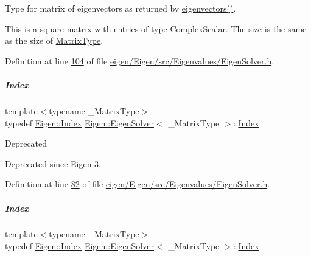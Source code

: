 Type for matrix of eigenvectors as returned by \hyperlink{group___eigenvalues___module_a66288022802172e3ee059283b26201d7}{eigenvectors()}. 

This is a square matrix with entries of type \hyperlink{group___eigenvalues___module_a4d0b2a773357d0a6ec98e026f04002ed}{Complex\+Scalar}. The size is the same as the size of \hyperlink{group___eigenvalues___module_a83acd180404ddaac8a678fa65a6b632b}{Matrix\+Type}. 

Definition at line \hyperlink{eigen_2_eigen_2src_2_eigenvalues_2_eigen_solver_8h_source_l00104}{104} of file \hyperlink{eigen_2_eigen_2src_2_eigenvalues_2_eigen_solver_8h_source}{eigen/\+Eigen/src/\+Eigenvalues/\+Eigen\+Solver.\+h}.

\mbox{\label{group___eigenvalues___module_a5bff6a6bc0efac67d52c60c2c3deb9ee}} 
\subparagraph{\texorpdfstring{Index}{Index}\hspace{0.1cm}{\footnotesize\ttfamily [1/2]}}
{\footnotesize\ttfamily template$<$typename \+\_\+\+Matrix\+Type$>$ \\
typedef \hyperlink{namespace_eigen_a62e77e0933482dafde8fe197d9a2cfde}{Eigen\+::\+Index} \hyperlink{group___eigenvalues___module_class_eigen_1_1_eigen_solver}{Eigen\+::\+Eigen\+Solver}$<$ \+\_\+\+Matrix\+Type $>$\+::\hyperlink{group___eigenvalues___module_a5bff6a6bc0efac67d52c60c2c3deb9ee}{Index}}

\begin{DoxyRefDesc}{Deprecated}
\item[\hyperlink{deprecated__deprecated000018}{Deprecated}]since \hyperlink{namespace_eigen}{Eigen} 3. \end{DoxyRefDesc}


Definition at line \hyperlink{eigen_2_eigen_2src_2_eigenvalues_2_eigen_solver_8h_source_l00082}{82} of file \hyperlink{eigen_2_eigen_2src_2_eigenvalues_2_eigen_solver_8h_source}{eigen/\+Eigen/src/\+Eigenvalues/\+Eigen\+Solver.\+h}.

\mbox{\label{group___eigenvalues___module_a5bff6a6bc0efac67d52c60c2c3deb9ee}} 
\subparagraph{\texorpdfstring{Index}{Index}\hspace{0.1cm}{\footnotesize\ttfamily [2/2]}}
{\footnotesize\ttfamily template$<$typename \+\_\+\+Matrix\+Type$>$ \\
typedef \hyperlink{namespace_eigen_a62e77e0933482dafde8fe197d9a2cfde}{Eigen\+::\+Index} \hyperlink{group___eigenvalues___module_class_eigen_1_1_eigen_solver}{Eigen\+::\+Eigen\+Solver}$<$ \+\_\+\+Matrix\+Type $>$\+::\hyperlink{group___eigenvalues___module_a5bff6a6bc0efac67d52c60c2c3deb9ee}{Index}}


